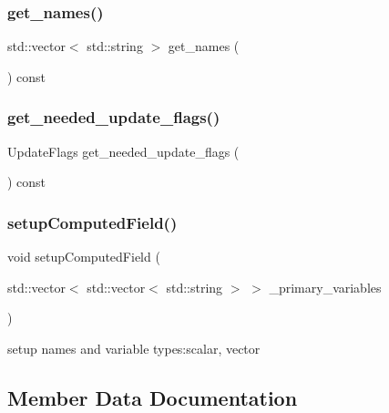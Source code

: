 \mbox{\label{classcomputed_field_a08e571d88aae15fdb3162f74bf9fd6e7}} 
\subsubsection{\texorpdfstring{get\+\_\+names()}{get\_names()}}
{\footnotesize\ttfamily std\+::vector$<$ std\+::string $>$ get\+\_\+names (\begin{DoxyParamCaption}{ }\end{DoxyParamCaption}) const}

\mbox{\label{classcomputed_field_ac3df6aa570f6a91215394fd4951e9f93}} 
\subsubsection{\texorpdfstring{get\+\_\+needed\+\_\+update\+\_\+flags()}{get\_needed\_update\_flags()}}
{\footnotesize\ttfamily Update\+Flags get\+\_\+needed\+\_\+update\+\_\+flags (\begin{DoxyParamCaption}{ }\end{DoxyParamCaption}) const\hspace{0.3cm}{\ttfamily [virtual]}}

\mbox{\label{classcomputed_field_ac6ff6cde468abcaa2ee7c9c4fd6b9047}} 
\subsubsection{\texorpdfstring{setup\+Computed\+Field()}{setupComputedField()}}
{\footnotesize\ttfamily void setup\+Computed\+Field (\begin{DoxyParamCaption}\item[{std\+::vector$<$ std\+::vector$<$ std\+::string $>$ $>$}]{\+\_\+primary\+\_\+variables }\end{DoxyParamCaption})}

setup names and variable types\+:scalar, vector 

\subsection{Member Data Documentation}
\mbox{\label{classcomputed_field_a4933860ad833b7b9bd2b8effee5c36d6}} 
